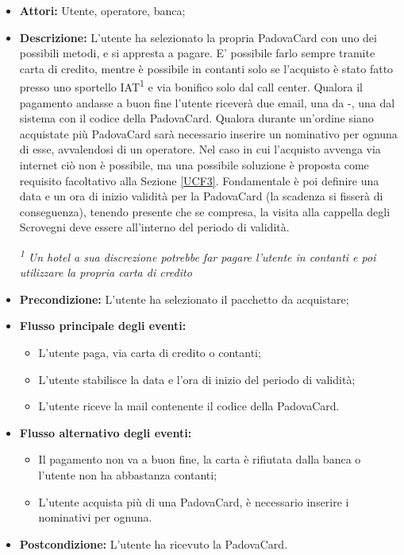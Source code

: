 \begin{itemize}
\item \textbf{Attori:} Utente, operatore, banca;
\item \textbf{Descrizione:} L'utente ha selezionato la propria PadovaCard con uno dei possibili metodi, e si appresta a pagare. E' possibile farlo sempre tramite carta di credito, mentre è possibile  in contanti solo se l'acquisto è stato fatto presso uno sportello IAT\textsuperscript{1}  e via bonifico solo dal call center. Qualora il pagamento andasse a buon fine l'utente riceverà due email, una da \tlite     -\vivaticket, una dal sistema con il codice della PadovaCard. Qualora durante un'ordine siano acquistate più PadovaCard sarà necessario inserire un nominativo per ognuna di esse, avvalendosi di un operatore. Nel caso in cui l'acquisto avvenga via internet ciò non è possibile, ma una possibile soluzione è proposta come requisito facoltativo alla Sezione \ref{UCF3}.
Fondamentale è poi definire una data e un ora di inizio validità per la PadovaCard (la scadenza si fisserà di conseguenza), tenendo presente che se compresa, la visita alla cappella degli Scrovegni deve essere all'interno del periodo di validità.\\
\begin{footnotesize}
\textit{\textsuperscript{1} Un hotel a sua discrezione potrebbe far pagare l'utente in contanti e poi utilizzare la propria carta di credito}
\end{footnotesize}
\item \textbf{Precondizione:} L'utente ha selezionato il pacchetto da acquistare;
\item \textbf{Flusso principale degli eventi:}
	\begin{itemize}
		\item L'utente paga, via carta di credito o contanti;
        \item L'utente stabilisce la data e l'ora di inizio del periodo di validità;
		\item L'utente riceve la mail contenente il codice della PadovaCard.
	\end{itemize}
    \item \textbf{Flusso alternativo degli eventi:}
	\begin{itemize}
    	\item Il pagamento non va a buon fine, la carta è rifiutata dalla banca o l'utente non ha abbastanza contanti;
		\item L'utente acquista più di una PadovaCard, è necessario inserire i nominativi per ognuna.
	\end{itemize}
\item \textbf{Postcondizione:} L'utente ha ricevuto la PadovaCard.
\end{itemize}

